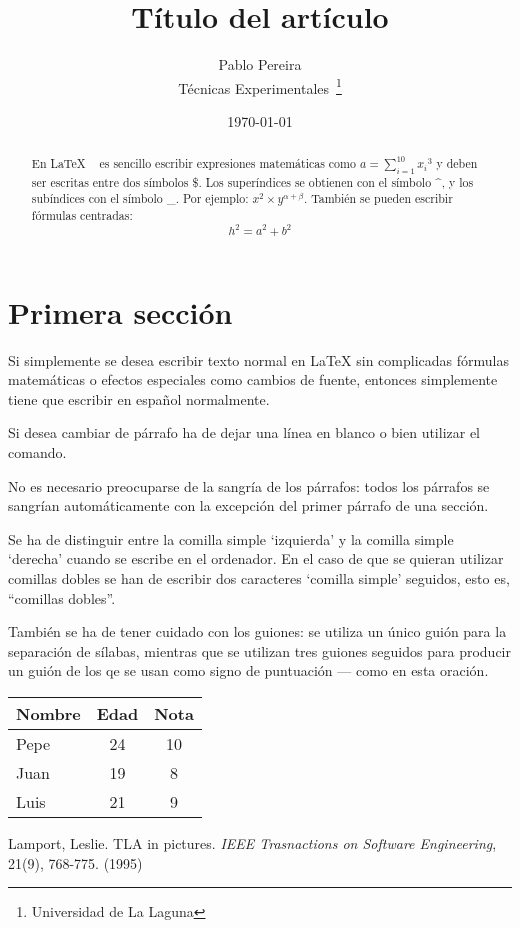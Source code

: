 \documentclass[a4paper,12pt]{article}
\begin{document}
\title{Título del artículo}
\author{Pablo Pereira \\
Técnicas Experimentales~\footnote{Universidad de La Laguna}
}
\date{\today}
\maketitle
\begin{abstract}
En \LaTeX{} ~\cite{Lam:86} es sencillo escribir expresiones
matemáticas como $a=\sum_{i=1}^{10} {x_i}^{3}$
y deben ser escritas entre dos símbolos \$.
Los superíndices se obtienen con el símbolo \^{}, y
los subíndices con el símbolo \_.
Por ejemplo: $x^2 \times y^{\alpha + \beta}$.
También se pueden escribir fórmulas centradas:
\[h^2=a^2 + b^2 \]
\end{abstract}

\section{Primera sección}
Si simplemente se desea escribir texto normal en LaTeX
sin complicadas f\'ormulas matem\'aticas o efectos especiales
como cambios de fuente, entonces simplemente tiene que escribir 
en espa\~nol normalmente. \par
Si desea cambiar de párrafo ha de dejar una línea en blanco o bien
utilizar el comando. \par
No es necesario preocuparse de la sangría de los párrafos:
todos los párrafos se sangrían automáticamente con la excepción 
del primer párrafo de una sección.

Se ha de distinguir entre la comilla simple `izquierda' 
y la comilla simple `derecha' cuando se escribe en el ordenador.
En el caso de que se quieran utilizar comillas dobles se han de 
escribir dos caracteres  `comilla simple' seguidos, esto es,
``comillas dobles''.

También se ha de tener cuidado con los guiones: se utiliza un único
guión para la separación de sílabas, mientras que se utilizan 
tres guiones seguidos para producir un guión de los qe se usan 
como signo de puntuación --- como en esta oración.

\bigskip
\begin{tabular}{|l|c|c|}
\hline
Nombre & Edad & Nota \\ \hline
Pepe & 24 & 10 \\ \hline
Juan & 19 & 8 \\ \hline
Luis & 21 & 9 \\ \hline
\end{tabular}
\begin{thebibliography}{00}
Lamport, Leslie.
TLA in pictures.
\emph{IEEE Trasnactions on Software Engineering},
21(9), 768-775.
(1995)
\end{thebibliography}
\end{document}
